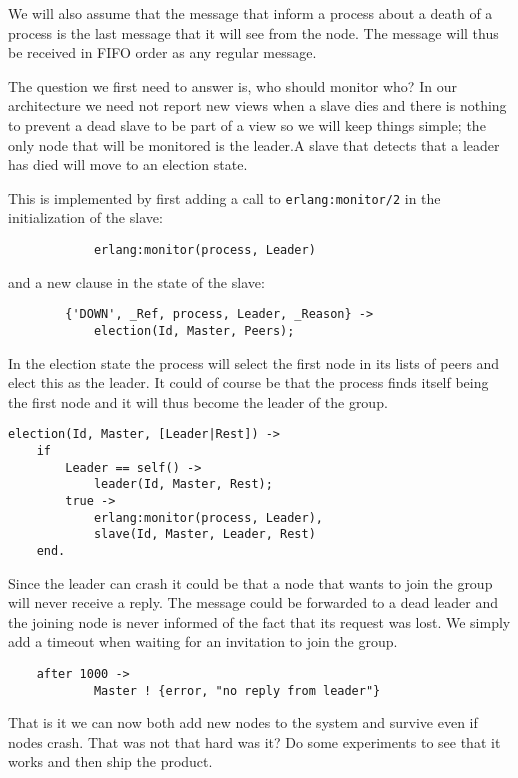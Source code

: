 \documentclass[a4paper,11pt]{article}
\begin{document}
We will also assume that the message that inform a process about a
death of a process is the last message that it will see from the
node. The message will thus be received in FIFO order as any regular
message.

The question we first need to answer is, who should monitor who? In
our architecture we need not report new views when a slave dies and
there is nothing to prevent a dead slave to be part of a view so we
will keep things simple; the only node that will be monitored is the
leader.A slave that detects that a leader has died will move to an
election state. 

This is implemented by first adding a call to {\tt erlang:monitor/2}
in the initialization of the slave:

\begin{verbatim}
            erlang:monitor(process, Leader)
\end{verbatim}

and a new clause in the state of the slave:

\begin{verbatim}
        {'DOWN', _Ref, process, Leader, _Reason} ->
            election(Id, Master, Peers);
\end{verbatim}


In the election state the process will select the first node in its
lists of peers and elect this as the leader. It could of course be
that the process finds itself being the first node and it will thus
become the leader of the group.

\begin{verbatim}
election(Id, Master, [Leader|Rest]) ->
    if 
        Leader == self() ->
            leader(Id, Master, Rest);
        true ->
            erlang:monitor(process, Leader),
            slave(Id, Master, Leader, Rest)
    end.
\end{verbatim}

Since the leader can crash it could be that a node that wants to join
the group will never receive a reply. The message could be forwarded
to a dead leader and the joining node is never informed of the fact
that its request was lost. We simply add a timeout when waiting for an
invitation to join the group.

\begin{verbatim}
    after 1000 ->
            Master ! {error, "no reply from leader"}
\end{verbatim}

That is it we can now both add new nodes to the system and survive
even if nodes crash. That was not that hard was it? Do some
experiments to see that it works and then ship the product.
\end{document}
